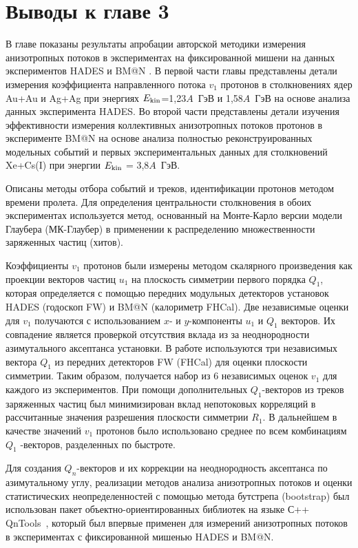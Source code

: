 \section{Выводы к главе 3}

В главе показаны результаты апробации авторской методики измерения анизотропных потоков в экспериментах
на фиксированной мишени на данных экспериментов  HADES \cite{Mamaev:2020qom,HADES:2020lob,Mamaev:2020lpi,Mamaev:2024-1,Mamaev:2024-2} 
и BM@N \cite{Mamaev:2024,Mamaev:2023yhz,Mamaev:2023fpr,doi:10.1142/S021830132441009X}.
В первой части главы пред­ставлены детали измерения коэффициента направленного потока $v_1$ протонов в
столкновениях ядер Au+Au и Ag+Ag при энергиях $E_{\rm kin}$=1,23$A$~ГэВ и 1,58$A$~ГэВ на
основе анализа данных эксперимента HADES. Во второй части  представ­лены детали изучения 
эффективности измерения коллективных анизотропных потоков протонов в эксперименте BM@N на основе 
анализа полностью реконструированных модельных событий и первых экспериментальных данных 
для столкновений Xe+Cs(I) при энергии $E_{\rm kin}$ = 3,8$A$~ГэВ.

Описаны методы отбора событий и треков, идентификации протонов методом времени пролета. 
Для определения центральности столкновения в обоих экспериментах используется метод, основанный на 
Монте-Карло версии модели Глаубера (МК-Глаубер) в применении к распределению множественности заряженных частиц (хитов).

Коэффициенты $v_1$ протонов были измерены методом скалярного произведения как проекции векторов частиц $u_1$  на плоскость симметрии первого порядка $Q_1$,
которая определяется с помощью передних модульных детекторов установок HADES (годоскоп FW)  и BM@N (калориметр FHCal).
Две независимые оценки для $v_1$ получаются с использованием $x$- и $y$-компоненты $u_1$ и $Q_1$  векторов. Их совпадение является
проверкой отсутствия вклада из за неоднородности азимутального аксептанса установки.
В работе используются три независимых вектора $Q_1$ из передних де­текторов FW (FHCal) для оценки плоскости симметрии.
Таким образом, получается набор из 6 независимых оценок  $v_1$ для каждого из экспериментов. 
При помощи дополнитель­ных $Q_1$-векторов из треков заряженных частиц был минимизирован вклад непотоковых корреляций в рассчитанные значения разрешения плоскости симметрии $R_1$.  
В дальнейшем в качестве значений $v_1$ протонов было использовано среднее по всем комбинациям $Q_1$ -векторов, разделенных по быстроте.

Для создания  $Q_n$-векторов и их коррекции на неоднородность аксептанса по азимутальному углу,
реализации методов анализа анизотропных потоков и оценки статистических 
неопределенностей с помощью метода бутстрепа (bootstrap) был использован  пакет объектно-ориентированных библиотек на языке С++ QnTools~\cite{QnTools}, который был впервые применен для измерений анизотропных потоков в экспериментах с фиксированной мишенью HADES и BM@N. 

